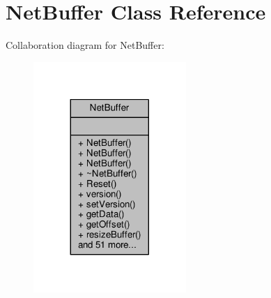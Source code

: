 \hypertarget{classNetBuffer}{}\section{Net\+Buffer Class Reference}
\label{classNetBuffer}


Collaboration diagram for Net\+Buffer\+:
\nopagebreak
\begin{figure}[H]
\begin{center}
\leavevmode
\includegraphics[width=164pt]{dc/d26/classNetBuffer__coll__graph}
\end{center}
\end{figure}
